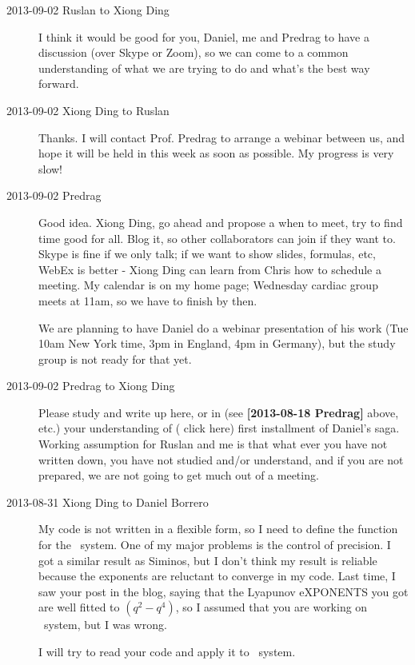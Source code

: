 \begin{description}
\item[2013-09-02 Ruslan to Xiong Ding]
I think it would be good for you, Daniel,
me and Predrag to have a discussion (over Skype or Zoom), so we can come to a common
understanding of what we are trying to do and what's the best way forward.

\item[2013-09-02 Xiong Ding to Ruslan] Thanks.
I will contact Prof. Predrag to arrange a webinar
between us, and hope it will be held in this week as soon as possible.
My progress is very slow!

\item[2013-09-02 Predrag] Good idea. Xiong Ding, go ahead and propose a
when to meet, try to find time good for all. Blog it, so
other collaborators can join if they want to. Skype is fine if we only talk; if we
want to show slides, formulas, etc, WebEx is better - Xiong Ding can learn from
Chris how to schedule a meeting. My calendar is on my home page; Wednesday
cardiac group meets at 11am, so we have to finish by then.

We are planning to have Daniel do a webinar presentation of his work
(Tue 10am New York time,
3pm in England, 4pm in Germany), but the study group is not ready for that yet.

\item[2013-09-02 Predrag to Xiong Ding]
Please study and write up here, or in  
(see {\bf [2013-08-18 Predrag]} above, etc.) your understanding of
( {click here}) first installment of Daniel's saga.
Working assumption for Ruslan and me is that what ever you have not written
down, you have not studied and/or understand, and if you are not prepared,
we are not going to get much out of a meeting.

\item[2013-08-31 Xiong Ding to Daniel Borrero]
My code is not written in a flexible form, so I need to define the function for the \KS\ system. One of my major problems is the control of precision. I got a similar result as Siminos, but I don't think my result is reliable because the exponents are reluctant to converge in my code. Last time, I saw your post in the blog, saying that the Lyapunov eXPONENTS you got are well fitted to $(q^2-q^4)$, so I assumed that you are working on \KS\ system, but I was wrong.

I will try to read your code and apply it to \KS\ system.


\end{description}

